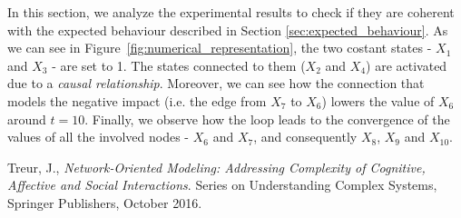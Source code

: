 \documentclass[a4paper]{article}
\begin{document}
In this section, we analyze the experimental results to check if they are coherent with the expected behaviour described in Section \ref{sec:expected_behaviour}. As we can see in Figure~\ref{fig:numerical_representation}, the two costant states - $X_{1}$ and $X_{3}$ - are set to 1. The states connected to them ($X_{2}$ and $X_{4}$) are activated due to a \textit{causal relationship}. Moreover, we can see how the connection that models the negative impact (i.e. the edge from $X_{7}$ to $X_{6}$) lowers the value of $X_{6}$ around $t = 10$. Finally, we observe how the loop leads to the convergence of the values of all the involved nodes - $X_{6}$ and $X_{7}$, and consequently $X_{8}$, $X_{9}$ and $X_{10}$.





\begin{thebibliography}{9}
  Treur, J.,
  \emph{Network-Oriented Modeling: Addressing Complexity of Cognitive, Affective and Social Interactions}.
  Series on Understanding Complex Systems, Springer Publishers, October 2016.

\end{thebibliography}
\end{document}
